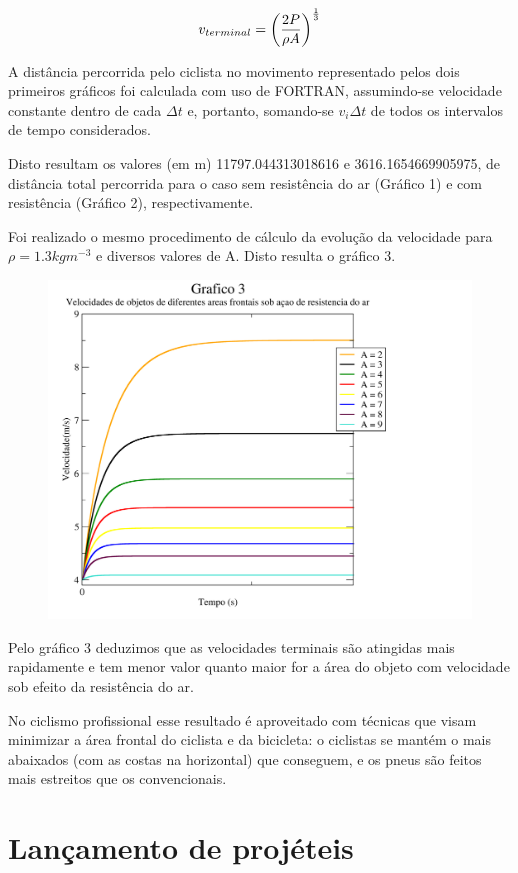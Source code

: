 \documentclass{article}
\begin{document}
\begin{equation}
  \label{eq:3}
  v_{terminal} = \left({2 P \over \rho A}\right)^{1\over3}
\end{equation}

A distância percorrida pelo ciclista no movimento representado pelos dois primeiros gráficos foi calculada com uso de FORTRAN, assumindo-se velocidade constante dentro de cada \(\Delta t\) e, portanto, somando-se \(v_i\Delta t\) de todos os intervalos de tempo considerados.\par
Disto resultam os valores (em m) 11797.044313018616 e 3616.1654669905975, de distância total percorrida para o caso sem resistência do ar (Gráfico 1) e com resistência (Gráfico 2), respectivamente.\par%
Foi realizado o mesmo procedimento de cálculo da evolução da velocidade para \(\rho = 1.3 kg m^{-3}\) e diversos valores de A. Disto resulta o gráfico 3.

\begin{figure}[h!]
  \centering
  \includegraphics[width=.64\textwidth]{graf3}
\end{figure}

Pelo gráfico 3 deduzimos que as velocidades terminais são atingidas mais rapidamente e tem menor valor quanto maior for a área do objeto com velocidade sob efeito da resistência do ar.\par
No ciclismo profissional esse resultado é aproveitado com técnicas que visam minimizar a área frontal do ciclista e da bicicleta: o ciclistas se mantém o mais abaixados (com as costas na horizontal) que conseguem, e os pneus são feitos mais estreitos que os convencionais.

\newpage
\section{Lançamento de projéteis}
\end{document}
